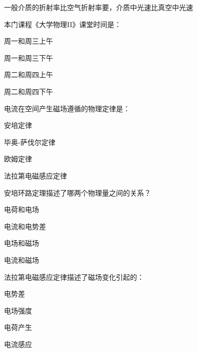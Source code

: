 \documentclass{njustexam}
\begin{document}
\begin{problem}
  一般介质的折射率比空气折射率要，介质中光速比真空中光速
\end{problem}



\begin{problem}

  本门课程《大学物理II》课堂时间是：
  \begin{abcd}
    \item 周一和周三上午
    \item 周一和周三下午
    \item 周二和周四上午
    \item 周二和周四下午
  \end{abcd}
\end{problem} 

\begin{problem}

  电流在空间产生磁场遵循的物理定律是：
  \begin{abcd}
    \item 安培定律
    \item 毕奥-萨伐尔定律
    \item 欧姆定律
    \item 法拉第电磁感应定律
  \end{abcd}
  \end{problem} 

\begin{problem}

  安培环路定理描述了哪两个物理量之间的关系？
  \begin{abcd}
\item 电荷和电场
\item 电流和电势差
\item 电场和磁场
\item 电流和磁场
  \end{abcd}
  \end{problem}

  \begin{problem}

    法拉第电磁感应定律描述了磁场变化引起的：
    \begin{abcd}
      \item 电势差
      \item 电场强度
      \item 电荷产生
      \item 电流感应
    \end{abcd}
    \end{problem}
\end{document}
